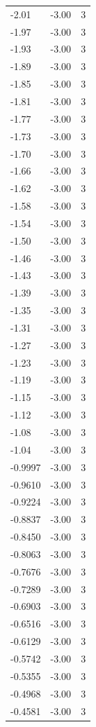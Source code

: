 \begin{longtable}{lrr}
  -2.01 & -3.00 & 3 \\
  -1.97 & -3.00 & 3 \\
  -1.93 & -3.00 & 3 \\
  -1.89 & -3.00 & 3 \\
  -1.85 & -3.00 & 3 \\
  -1.81 & -3.00 & 3 \\
  -1.77 & -3.00 & 3 \\
  -1.73 & -3.00 & 3 \\
  -1.70 & -3.00 & 3 \\
  -1.66 & -3.00 & 3 \\
  -1.62 & -3.00 & 3 \\
  -1.58 & -3.00 & 3 \\
  -1.54 & -3.00 & 3 \\
  -1.50 & -3.00 & 3 \\
  -1.46 & -3.00 & 3 \\
  -1.43 & -3.00 & 3 \\
  -1.39 & -3.00 & 3 \\
  -1.35 & -3.00 & 3 \\
  -1.31 & -3.00 & 3 \\
  -1.27 & -3.00 & 3 \\
  -1.23 & -3.00 & 3 \\
  -1.19 & -3.00 & 3 \\
  -1.15 & -3.00 & 3 \\
  -1.12 & -3.00 & 3 \\
  -1.08 & -3.00 & 3 \\
  -1.04 & -3.00 & 3 \\
  -0.9997 & -3.00 & 3 \\
  -0.9610 & -3.00 & 3 \\
  -0.9224 & -3.00 & 3 \\
  -0.8837 & -3.00 & 3 \\
  -0.8450 & -3.00 & 3 \\
  -0.8063 & -3.00 & 3 \\
  -0.7676 & -3.00 & 3 \\
  -0.7289 & -3.00 & 3 \\
  -0.6903 & -3.00 & 3 \\
  -0.6516 & -3.00 & 3 \\
  -0.6129 & -3.00 & 3 \\
  -0.5742 & -3.00 & 3 \\
  -0.5355 & -3.00 & 3 \\
  -0.4968 & -3.00 & 3 \\
  -0.4581 & -3.00 & 3 \\

\end{longtable}

